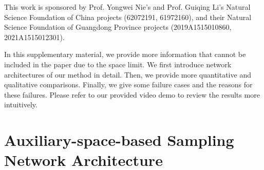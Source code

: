 \documentclass[sigconf,screen,nonacm]{acmart}
\begin{document}
\begin{acks}
		This work is sponsored by Prof. Yongwei Nie's and Prof. Guiqing Li's Natural Science Foundation of China projects (62072191, 61972160), and their Natural Science Foundation of Guangdong Province projects (2019A1515010860, 2021A1515012301).
	\end{acks}
	

	
	
\clearpage
	
	\appendix
	
	
	


	In this supplementary material, we provide more information that cannot be included in the paper due to the space limit. We first introduce network architectures of our method in detail. Then, we provide more quantitative and qualitative comparisons. Finally, we give some failure cases and the reasons for these failures. Please refer to our provided video demo to review the results more intuitively.
	
	
	\section{Auxiliary-space-based Sampling Network Architecture}
	
\end{document}
